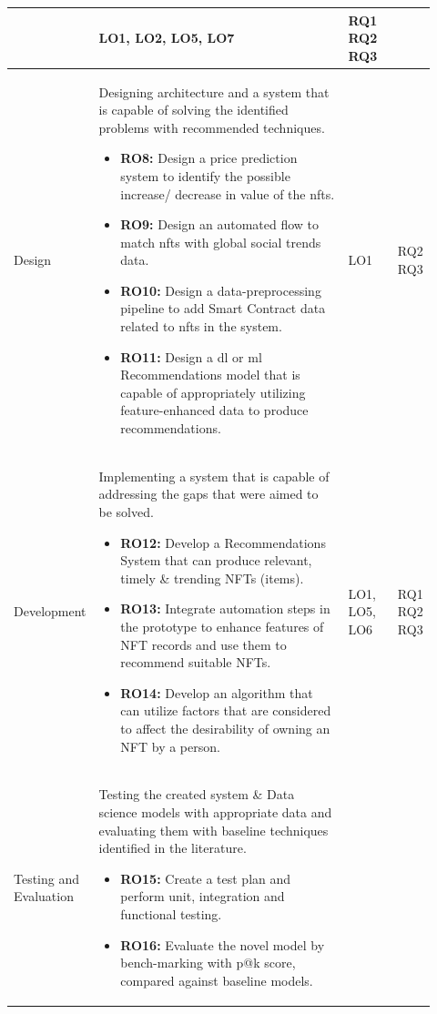 \begin{longtable}{| p{0.135\linewidth} | p{0.63\linewidth}| p{0.12\linewidth}| p{0.04\linewidth}|}
\begin{itemize}
\vspace{-7mm}       %
\end{itemize}
& LO1, LO2, LO5, LO7 
& RQ1 RQ2 RQ3
\\
\hline
Design & Designing architecture and a system that is capable of solving the identified problems with recommended techniques.
\begin{itemize}
\item \textbf{RO8:} Design a price prediction system to identify the possible increase/ decrease in value of the \Gls{nft}s.
\item \textbf{RO9:} Design an automated flow to match \Gls{nft}s with global social trends data.
\item \textbf{RO10:} Design a data-preprocessing pipeline to add Smart Contract data related to \Gls{nft}s in the system.
\item \textbf{RO11:} Design a \Gls{dl} or \Gls{ml} Recommendations model that is capable of appropriately utilizing feature-enhanced data to produce recommendations.
\vspace{-7mm}       %
\end{itemize}
& LO1 
& RQ2 RQ3
\\
\hline
Development & Implementing a system that is capable of addressing the gaps that were aimed to be solved. 
\begin{itemize}
\item \textbf{RO12:} Develop a Recommendations System that can produce relevant, timely \& trending NFTs (items).
\item \textbf{RO13:} Integrate automation steps in the prototype to enhance features of NFT records and use them to recommend suitable NFTs.
\item \textbf{RO14:} Develop an algorithm that can utilize factors that are considered to affect the desirability of owning an NFT by a person.
\vspace{-7mm}       %
\end{itemize}
& LO1, LO5, LO6
& RQ1 RQ2 RQ3
\\
\hline
Testing and Evaluation & Testing the created system \& Data science models with appropriate data and evaluating them with baseline techniques identified in the literature. 
\begin{itemize}
\item \textbf{RO15:} Create a test plan and perform unit, integration and functional testing.
\item \textbf{RO16:} Evaluate the novel model by bench-marking with  \Gls{p@k} score, compared against baseline models.

\end{itemize}
\end{longtable}

